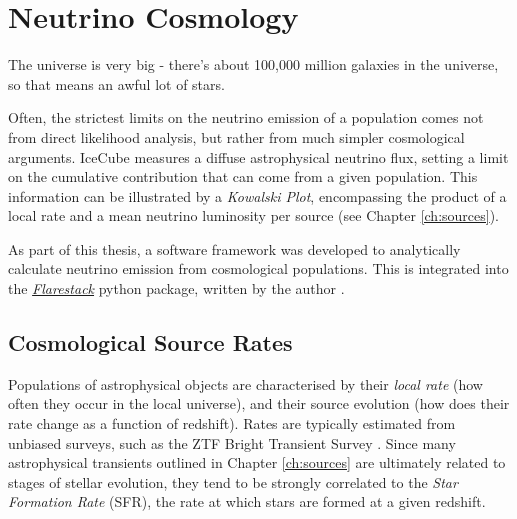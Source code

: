 \setchapterpreamble[u]{\margintoc}
\chapter{Neutrino Cosmology}
\begin{fquote}The universe is very big - there's about 100,000 million galaxies in the universe, so that means an awful lot of stars.
\end{fquote}

Often, the strictest limits on the neutrino emission of a population comes not from direct likelihood analysis, but rather from much simpler cosmological arguments. IceCube measures a diffuse astrophysical neutrino flux, setting a limit on the cumulative contribution that can come from a given population. This information can be illustrated by a \emph{Kowalski Plot}, encompassing the product of a local rate and a mean neutrino luminosity per source (see Chapter \ref{ch:sources}). 

As part of this thesis, a software framework was developed to analytically calculate neutrino emission from cosmological populations. This is integrated into the \emph{\href{https://github.com/IceCubeOpenSource/flarestack}{Flarestack}} python package, written by the author .

\section{Cosmological Source Rates}

Populations of astrophysical objects are characterised by their \emph{local rate} (how often they occur in the local universe), and their source evolution (how does their rate change as a function of redshift). Rates are typically estimated from unbiased surveys, such as the ZTF Bright Transient Survey . Since many astrophysical transients outlined in Chapter \ref{ch:sources} are ultimately related to stages of stellar evolution, they tend to be strongly correlated to the \emph{Star Formation Rate} (SFR), the rate at which stars are formed at a given redshift.

